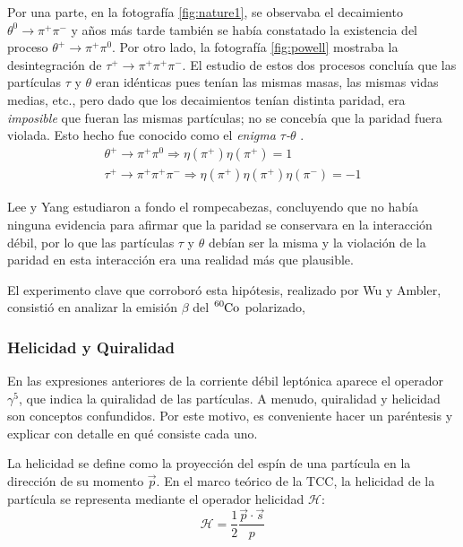 Por una parte, en la fotografía \ref{fig:nature1}, se observaba el decaimiento $\theta^{0} \rightarrow \pi^{+}\pi^{-}$ y años más tarde también se había constatado la existencia del proceso $\theta^{+} \rightarrow \pi^{+}\pi^{0}$. Por otro lado, la fotografía \ref{fig:powell} mostraba la desintegración de $\tau^+ \rightarrow \pi^{+}\pi^{+}\pi^{-}$.  El estudio de estos dos procesos concluía que las partículas $\tau$ y $\theta$ eran idénticas pues tenían las mismas masas, las mismas vidas medias, etc., pero dado que los decaimientos tenían distinta paridad, era \textit{imposible} que fueran las mismas partículas; no se concebía que la paridad fuera violada. Esto hecho fue conocido como el \textit{enigma $\tau$-$\theta$} \cite{Ferbel}.
\begin{equation}
\begin{gathered}
\theta^{+} \rightarrow \pi^{+}\pi^{0} \Rightarrow \eta\left(\pi^{+}\right) \eta\left(\pi^{+}\right) = 1 \\ 
\tau^{+} \rightarrow \pi^{+}\pi^{+}\pi^{-} \Rightarrow \eta\left(\pi^{+}\right) \eta\left(\pi^{+}\right) \eta\left(\pi^{-}\right) = -1
\end{gathered}
\end{equation}

Lee y Yang estudiaron a fondo el rompecabezas, concluyendo que no había ninguna evidencia para afirmar que la paridad se conservara en la interacción débil, por lo que las partículas $\tau$ y $\theta$ debían ser la misma y la violación de la paridad en esta interacción era una realidad más que plausible. 

El experimento clave que corroboró esta hipótesis, realizado por Wu y Ambler, consistió en analizar la emisión $\beta$ del $\tensor*[^{60}]{\mathrm{Co}}{}$ polarizado,

\subsubsection{Helicidad y Quiralidad}\label{sec:quirality}
En las expresiones anteriores de la corriente débil leptónica aparece el operador $\gamma^5$, que indica la quiralidad de las partículas. A menudo, quiralidad y helicidad son conceptos confundidos. Por este motivo, es conveniente hacer un paréntesis y explicar con detalle en qué consiste cada uno.

La helicidad se define como la proyección del espín de una partícula en la dirección de su momento $\vec{p}$. En el marco teórico de la TCC, la helicidad de la partícula se representa mediante el operador helicidad $\mathcal{H}$:
\begin{equation}
\mathcal{H}=\dfrac{1}{2} \dfrac{\vec{p} \cdot \vec{s}}{p}
\end{equation} 


